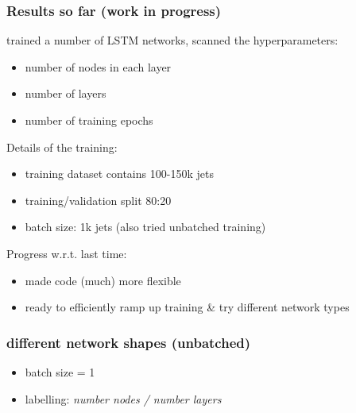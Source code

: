 \documentclass{beamer}
\begin{document}
\begin{frame}
  \frametitle{Results so far (work in progress)}
  trained a number of LSTM networks, scanned the hyperparameters:
    \begin{itemize}
    \item number of nodes in each layer
    \item number of layers
    \item number of training epochs
    \end{itemize}
  
  Details of the training:
  \begin{itemize}
  \item training dataset contains 100-150k jets
  \item training/validation split 80:20
  \item batch size: 1k jets (also tried unbatched training)
  \end{itemize}

  Progress w.r.t. last time:
  \begin{itemize}
    \item made code (much) more flexible
    \item ready to efficiently ramp up training \& try different network types
  \end{itemize}  
\end{frame}

\begin{frame}
  \frametitle{different network shapes (unbatched)}
  \begin{itemize}
  \item batch size = 1
    \item labelling: \textsl{number nodes / number layers}
  \end{itemize}
  
    \begin{figure}[htb]
    \centering
  \end{figure}

\end{frame}
\end{document}
